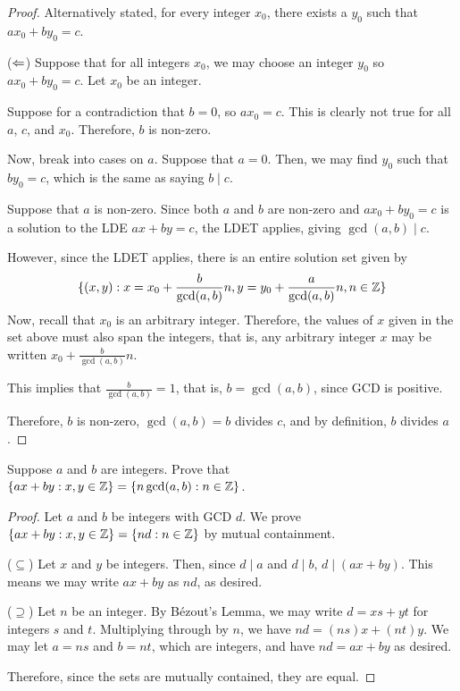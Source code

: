\begin{enumerate}[(a)]
\begin{proof}
          Alternatively stated, for every integer $x_0$, there exists a $y_0$ such that $ax_0+by_0=c$.

          ($\Leftarrow$) Suppose that for all integers $x_0$, we may choose an integer $y_0$ so $ax_0+by_0=c$.
          Let $x_0$ be an integer.

          Suppose for a contradiction that $b=0$, so $ax_0=c$.
          This is clearly not true for all $a$, $c$, and $x_0$.
          Therefore, $b$ is non-zero.
          
          Now, break into cases on $a$.
          Suppose that $a=0$. 
          Then, we may find $y_0$ such that $by_0=c$, which is the same as saying $b \mid c$.

          Suppose that $a$ is non-zero.
          Since both $a$ and $b$ are non-zero and $ax_0+by_0=c$ is a solution to the LDE $ax+by=c$,
          the LDET applies, giving $\gcd(a,b) \mid c$.

          However, since the LDET applies, there is an entire solution set given by
          \begin{equation*}
            \{(x,y) : x=x_0+\frac{b}{\gcd(a,b)}n, y=y_0+\frac{a}{\gcd(a,b)}n, n\in\mathbb{Z}\}
          \end{equation*}
          Now, recall that $x_0$ is an arbitrary integer.
          Therefore, the values of $x$ given in the set above must also span the integers, that is,
          any arbitrary integer $x$ may be written $x_0+\frac{b}{\gcd(a,b)}n$.

          This implies that $\frac{b}{\gcd(a,b)}=1$, that is, $b=\gcd(a,b)$, since GCD is positive.

          Therefore, $b$ is non-zero, $\gcd(a,b)=b$ divides $c$, and by definition, $b$ divides $a$.
        \end{proof}
\end{enumerate}


\begin{recommended}
  Suppose $a$ and $b$ are integers.
  Prove that $\{ax+by : x,y\in\mathbb{Z}\} = {\{n\gcd(a,b) : n\in\mathbb{Z}\}}$.
\end{recommended}
\begin{proof}
  Let $a$ and $b$ be integers with GCD $d$.
  We prove $\{ax+by : x,y\in\mathbb{Z}\}=\{nd : n\in\mathbb{Z}\}$ by mutual containment.

  ($\subseteq$) Let $x$ and $y$ be integers.
  Then, since $d \mid a$ and $d \mid b$, $d \mid (ax+by)$.
  This means we may write $ax+by$ as $nd$, as desired.

  ($\supseteq$) Let $n$ be an integer.
  By Bézout's Lemma, we may write $d=xs+yt$ for integers $s$ and $t$.
  Multiplying through by $n$, we have $nd=(ns)x+(nt)y$.
  We may let $a=ns$ and $b=nt$, which are integers, and have $nd=ax+by$ as desired.

  Therefore, since the sets are mutually contained, they are equal.
\end{proof}

